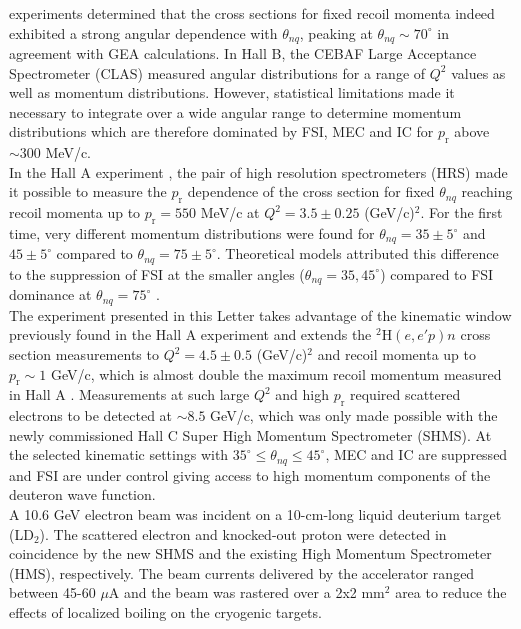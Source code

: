 \documentclass[aps,prl,twocolumn,showpacs,superscriptaddress,groupedaddress]{revtex4-2}  %
\begin{document}
experiments determined that the cross sections for fixed recoil momenta indeed exhibited a strong angular dependence with $\theta_{nq}$, peaking
at $\theta_{nq} \sim 70^{\circ}$ in agreement with GEA \cite{Sargsian_2001,PhysRevC.56.1124} calculations. In Hall B, the CEBAF Large Acceptance Spectrometer (CLAS) measured angular
distributions for a range of $Q^2$ values as well as momentum distributions. However, statistical limitations made it necessary to integrate over a wide angular range to determine momentum distributions
which are therefore dominated by  FSI, MEC and IC for $p_{\mathrm{r}}$ above $\sim 300$ MeV/c. \\
\indent In the Hall A experiment \cite{PhysRevLett.107.262501}, the pair of high resolution spectrometers (HRS) made it possible to measure the $p_{\mathrm{r}}$ dependence of the cross section for fixed $\theta_{nq}$
reaching recoil momenta up to $p_{\mathrm{r}}=550$ MeV/c at $Q^{2}=3.5\pm0.25$ (GeV/c)$^{2}$. For the first time, very different momentum distributions were found for $\theta_{nq}=35\pm5^{\circ}$
and $45\pm5^{\circ}$ compared to  $\theta_{nq}=75\pm5^{\circ}$. Theoretical models attributed this difference  to the suppression of FSI at the smaller angles ($\theta_{nq}=35, 45^{\circ}$) compared to FSI
dominance at $\theta_{nq}=75^{\circ}$ \cite{PhysRevLett.107.262501}. \\
\indent The experiment presented in this Letter takes advantage of the kinematic window previously found in the Hall A experiment \cite{PhysRevLett.107.262501} and extends the $^{2}\mathrm{H}(e,e'p)n$ cross section measurements
to $Q^{2}=4.5\pm0.5$ (GeV/c)$^{2}$ and recoil momenta up to $p_{\mathrm{r}}\sim 1$ GeV/c, which is almost double the maximum recoil momentum measured in Hall A \cite{PhysRevLett.107.262501}.
Measurements at such large $Q^{2}$ and high $p_{\mathrm{r}}$ required scattered electrons to be detected at $\sim 8.5$ GeV/c, which was only made possible with the newly commissioned Hall C Super High Momentum Spectrometer (SHMS).
At the selected kinematic settings with $35^{\circ} \leq \theta_{nq} \leq45^{\circ}$, MEC and IC are suppressed and FSI are under control giving access to high momentum components of the deuteron wave function.\\
\indent A 10.6 GeV electron beam was incident on a 10-cm-long liquid deuterium target (LD$_{2}$). The scattered electron and knocked-out proton were detected in coincidence
by the new SHMS and the existing High Momentum Spectrometer (HMS), respectively. The beam currents delivered by the accelerator ranged between 45-60 $\mu$A and the beam was rastered over a 2x2 mm$^{2}$ area to reduce the effects of localized boiling on the cryogenic targets.\\ 
\end{document}
